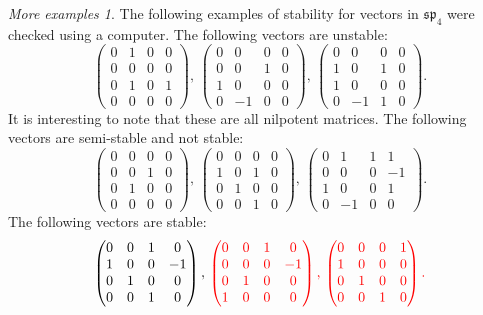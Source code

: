 \documentclass[12pt]{amsart}
\theoremstyle{remark}
\theoremstyle{remark}
\theoremstyle{remark}
\newtheorem*{moreexamples}{More examples}
\begin{document}
\begin{moreexamples}
The following examples of stability for vectors in $\mathfrak{sp}_4$ were checked using a computer.
The following vectors are unstable:
$$
\begin{pmatrix} 
	0 & 1 & 0 & 0 \\ 
	0 & 0 & 0 & 0 \\
	0 & 1 & 0 & 1 \\
	0 & 0 & 0 & 0
\end{pmatrix}, \, 
\begin{pmatrix} 
	0 & 0 & 0 & 0 \\ 
	0 & 0 & 1 & 0 \\
	1 & 0 & 0 & 0 \\
	0 & -1 & 0 & 0
\end{pmatrix}, \, 
\begin{pmatrix} 
	0 & 0 & 0 & 0 \\ 
	1 & 0 & 1 & 0 \\
	1 & 0 & 0 & 0 \\
	0 & -1 & 1 & 0
\end{pmatrix}.
$$
It is interesting to note that these are all nilpotent matrices.
The following vectors are semi-stable and not stable:
$$
\begin{pmatrix} 
	0 & 0 & 0 & 0 \\ 
	0 & 0 & 1 & 0 \\
	0 & 1 & 0 & 0 \\
	0 & 0 & 0 & 0
\end{pmatrix}, \, 
\begin{pmatrix} 
	0 & 0 & 0 & 0 \\ 
	1 & 0 & 1 & 0 \\
	0 & 1 & 0 & 0 \\
	0 & 0 & 1 & 0
\end{pmatrix}, \, 
\begin{pmatrix} 
	0 & 1 & 1 & 1 \\ 
	0 & 0 & 0 & -1 \\
	1 & 0 & 0 & 1 \\
	0 & -1 & 0 & 0
\end{pmatrix}.
$$
The following vectors are stable:
$$
\begin{pmatrix} 
	0 & 0 & 1 & 0 \\ 
	1 & 0 & 0 & -1 \\
	0 & 1 & 0 & 0 \\
	0 & 0 & 1 & 0
\end{pmatrix}, \,
\textcolor{red}{\begin{pmatrix} 
	0 & 0 & 1 & 0 \\ 
	0 & 0 & 0 & -1 \\
	0 & 1 & 0 & 0 \\
	1 & 0 & 0 & 0
\end{pmatrix}, \, 
\begin{pmatrix} 
	0 & 0 & 0 & 1 \\ 
	1 & 0 & 0 & 0 \\
	0 & 1 & 0 & 0 \\
	0 & 0 & 1 & 0
\end{pmatrix}.}
$$ \\
\end{moreexamples}
\end{document}
